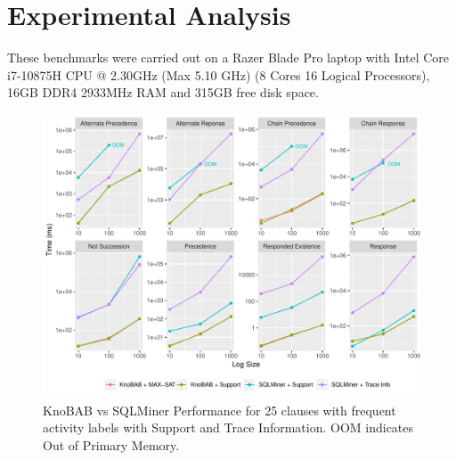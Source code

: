 
\section{Experimental Analysis}\label{sec:exp}
These benchmarks were carried out on a Razer Blade Pro laptop with Intel Core i7-10875H CPU @ 2.30GHz (Max 5.10 GHz) (8 Cores 16 Logical Processors), 16GB DDR4 2933MHz RAM and 315GB free disk space.

\begin{figure}[!t]
	\centering
	\includegraphics[width=.65\textwidth]{images/sqlminer_benchmark.pdf}
	\caption{KnoBAB vs SQLMiner Performance for 25  clauses with frequent activity labels with Support and Trace Information. OOM indicates Out of Primary Memory.}\label{fig:vsSQL}
\end{figure}



